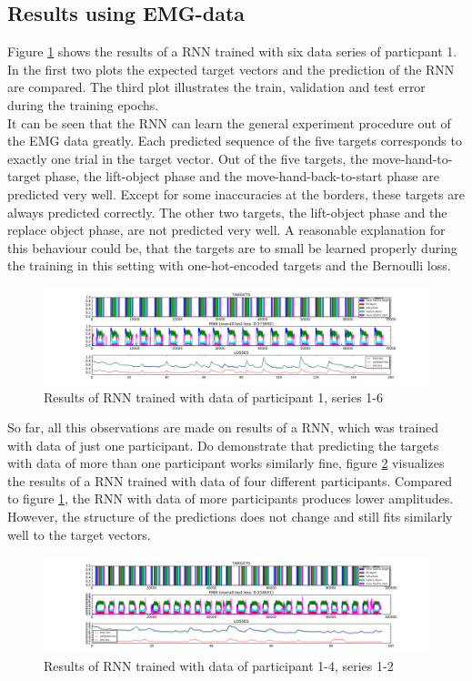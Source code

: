 \documentclass{article} %
\begin{document}
\subsection{Results using EMG-data}
Figure \ref{fig:emg_RNN_1} shows the results of a RNN trained with six data series of particpant 1. In the first two plots the expected target vectors and the prediction of the RNN are compared. The third plot illustrates the train, validation and test error during the training epochs.\\

It can be seen that the RNN can learn the general experiment procedure out of the EMG data greatly. Each predicted sequence of the five targets corresponds to exactly one trial in the target vector. Out of the five targets, the move-hand-to-target phase, the lift-object phase and the move-hand-back-to-start phase are predicted very well. Except for some inaccuracies at the borders, these targets are always predicted correctly. The other two targets, the lift-object phase and the replace object phase, are not predicted very well. A reasonable explanation for this behaviour could be, that the targets are to small be learned properly during the training in this setting with one-hot-encoded targets and the Bernoulli loss.\\
\begin{figure}
	\centering
	\includegraphics[width=1.0\textwidth]{images/EMG-results_participant_1_series1-6.png}
	\caption{Results of RNN trained with data of participant 1, series 1-6}
	\label{fig:emg_RNN_1}
\end{figure}

So far, all this observations are made on results of a RNN, which was trained with data of just one participant. Do demonstrate that predicting the targets with data of more than one participant works similarly fine, figure \ref{fig:emg_RNN_2} visualizes the results of a RNN trained with data of four different participants. Compared to figure \ref{fig:emg_RNN_1}, the RNN with data of more participants produces lower amplitudes. However, the structure of the predictions does not change and still fits similarly well to the target vectors.
\begin{figure}
	\centering
	\includegraphics[width=1.0\textwidth]{images/EMG-results_participant_1-4_series1-2.png}
	\caption{Results of RNN trained with data of participant 1-4, series 1-2}
	\label{fig:emg_RNN_2}
\end{figure}
\end{document}
